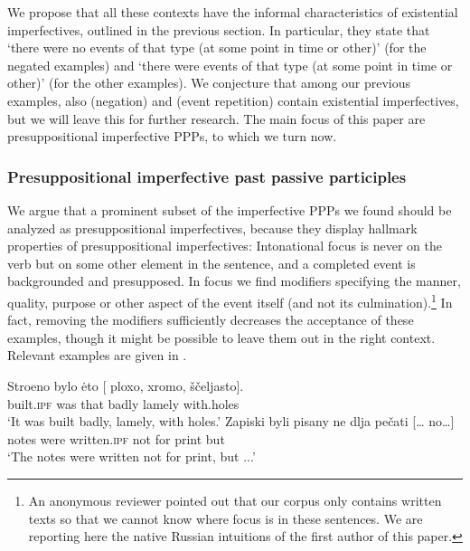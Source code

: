 \documentclass[output=paper,
modfonts,
newtxmath,
hidelinks
]{langscibook}
\begin{document}
\noindent We propose that all these contexts have the informal characteristics of existential imperfectives, outlined in the previous section. In particular, they state that `there were no events of that type (at some point in time or other)' (for the negated examples) and `there were events of that type (at some point in time or other)' (for the other examples). We conjecture that among our previous examples, also  (negation) and  (event repetition) contain existential imperfectives, but we will leave this for further research. The main focus of this paper are presuppositional imperfective PPPs, to which we turn now.

\subsubsection{Presuppositional imperfective past passive participles}

We argue that a prominent subset of the imperfective PPPs we found should be analyzed as presuppositional imperfectives, because they display hallmark properties of presuppositional imperfectives: Intonational focus is never on the verb but on some other element in the sentence, and a completed event is backgrounded and presupposed. In focus we find modifiers specifying the manner, quality, purpose or other aspect of the event itself (and not its culmination).\footnote{An anonymous reviewer pointed out that our corpus only contains written texts so that we cannot know where focus is in these sentences. We are reporting here the native Russian intuitions of the first author of this paper.} In fact, removing the modifiers sufficiently decreases the acceptance of these examples, though it might be possible to leave them out in the right context. Relevant examples are given in .  

\ea\label{stroeno}
\ea\gll 	Stroeno bylo \.{e}to [\hspace{-2pt} ploxo, xromo, ščeljasto].\\
	built.\textsc{ipf} was that {} badly lamely with.holes\\
\glt	`It was built badly, lamely, with holes.' \label{stroenoa}
\ex\gll 	Zapiski byli pisany ne dlja pečati [{\dots} no\dots]\\	
	notes were written.\textsc{ipf} not for print {} but {}\\
\glt	`The notes were written not for print, but ...' \label{zapiski}
\z\z
\end{document}
